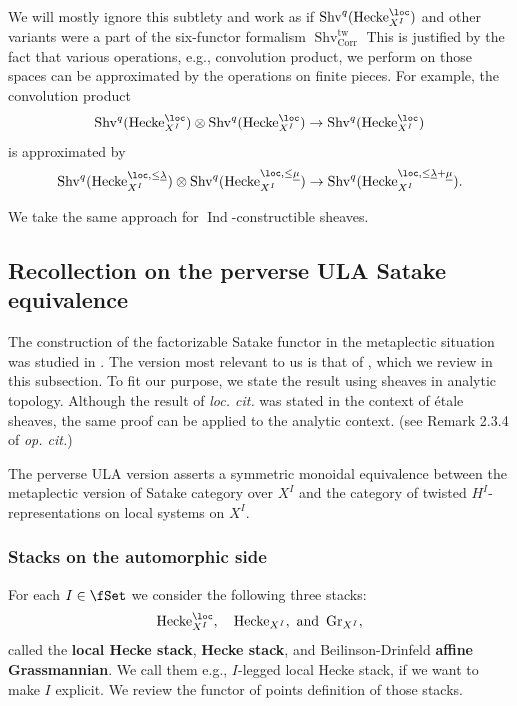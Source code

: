 \documentclass[10pt]{amsart}
\newcommand{\sssec}{\subsubsection}
\theoremstyle{remark}
\newcommand{\te}{\text}
\newcommand{\ul}{\underline}
\newcommand{\on}{\operatorname}
\newcommand{\Shv}{\on{Shv}}
\DeclareMathOperator{\Ind}{Ind}
\newcommand{\Gr}{\on{Gr}}
\newcommand{\Hecke}{\on{Hecke}}
\newcommand{\Corr}{\on{Corr}}
\begin{document}
We will mostly ignore this subtlety and work as if $\Shv^q(\Hecke^{\loc}_{X^I})$ and other variants were a part of the six-functor formalism $\Shv^{\on{tw}}_{\Corr}$
This is justified by the fact that various operations, e.g., convolution product, we perform on those spaces can be approximated by the operations on finite pieces. For example, the convolution product
\[\Shv^q(\Hecke^{\loc}_{X^I})\otimes \Shv^q(\Hecke^{\loc}_{X^I})\rightarrow \Shv^q(\Hecke^{\loc}_{X^I})\]
is approximated by
\[\Shv^q(\Hecke^{\loc,\le\ul{\lambda}}_{X^I})\otimes \Shv^q(\Hecke^{\loc,\le\ul{\mu}}_{X^I})\rightarrow \Shv^q(\Hecke^{\loc,\le\ul{\lambda}+\ul{\mu}}_{X^I}).\]

We take the same approach for $\Ind$-constructible sheaves.


\subsection{Recollection on the perverse ULA Satake equivalence}\label{ssec: recollection perv ULA}
The construction of the factorizable Satake functor in the metaplectic situation was studied in \cite{Rei, GL, ZhaoNew}. The version most relevant to us is that of \cite[Theorem 2.3.2]{ZhaoNew}, which we review in this subsection. To fit our purpose, we state the result using sheaves in analytic topology.
Although the result of \emph{loc. cit.} was stated in the context of \'etale sheaves, the same proof can be applied to the analytic context. (see Remark 2.3.4 of \emph{op. cit.})
\medskip

The perverse ULA version asserts a symmetric monoidal equivalence between the metaplectic version of Satake category over $X^I$ and the category of twisted $H^I$-representations on local systems on $X^I$.

\sssec{Stacks on the automorphic side}\label{sssec: stacks on the A side}
For each $I\in\fSet$ we consider the following three stacks:
\[\Hecke^{\loc}_{X^I}, \quad \Hecke_{X^I}, \ \te{and} \ \Gr_{X^I},\]
called the \textbf{local Hecke stack}, \textbf{Hecke stack}, and Beilinson-Drinfeld \textbf{affine Grassmannian}. We call them e.g., $I$-legged local Hecke stack, if we want to make $I$ explicit. We review the functor of points definition of those stacks. 
\medskip
\end{document}
